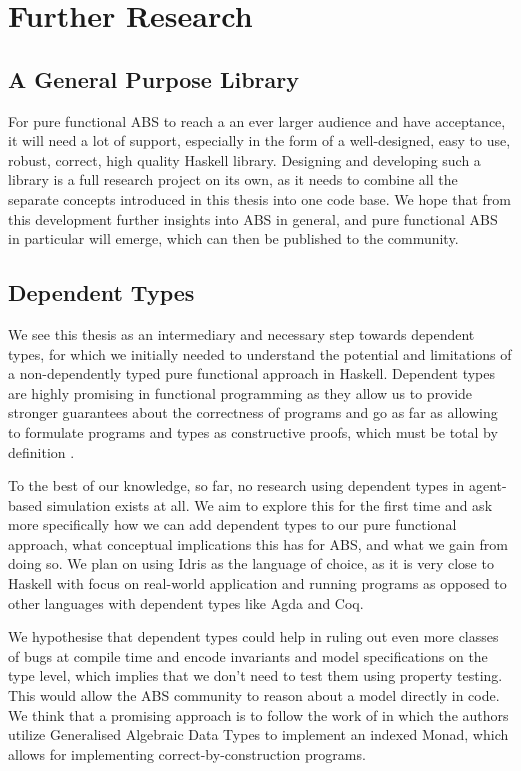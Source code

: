 \section{Further Research}
\subsection{A General Purpose Library}
For pure functional ABS to reach a an ever larger audience and have acceptance, it will need a lot of support, especially in the form of a well-designed, easy to use, robust, correct, high quality Haskell library. Designing and developing such a library is a full research project on its own, as it needs to combine all the separate concepts introduced in this thesis into one code base. We hope that from this development further insights into ABS in general, and pure functional ABS in particular will emerge, which can then be published to the community.

\subsection{Dependent Types}
We see this thesis as an intermediary and necessary step towards dependent types, for which we initially needed to understand the potential and limitations of a non-dependently typed pure functional approach in Haskell. Dependent types are highly promising in functional programming as they allow us to provide stronger guarantees about the correctness of programs and go as far as allowing to formulate programs and types as constructive proofs, which must be total by definition \cite{altenkirch_pi_2010, altenkirch_why_2005, thompson_type_1991}.

To the best of our knowledge, so far, no research using dependent types in agent-based simulation exists at all. We aim to explore this for the first time and ask more specifically how we can add dependent types to our pure functional approach, what conceptual implications this has for ABS, and what we gain from doing so. We plan on using Idris \cite{brady_idris_2013} as the language of choice, as it is very close to Haskell with focus on real-world application and running programs as opposed to other languages with dependent types like Agda and Coq.

We hypothesise that dependent types could help in ruling out even more classes of bugs at compile time and encode invariants and model specifications on the type level, which implies that we don't need to test them using property testing. This would allow the ABS community to reason about a model directly in code. We think that a promising approach is to follow the work of \cite{brady_programming_2013, brady_state_2016, fowler_dependent_2014} in which the authors utilize Generalised Algebraic Data Types to implement an indexed Monad, which allows for implementing correct-by-construction programs.

